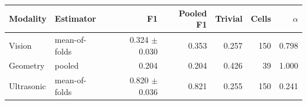 \begin{tabular}{@{}llrrrrr@{}}
\toprule
Modality & Estimator & F1 & Pooled F1 & Trivial & Cells & $\alpha$ \\
\midrule
Vision & mean-of-folds & 0.324 $\pm$ 0.030 & 0.353 & 0.257 & 150 & 0.798 \\
Geometry & pooled & 0.204 & 0.204 & 0.426 & 39 & 1.000 \\
Ultrasonic & mean-of-folds & 0.820 $\pm$ 0.036 & 0.821 & 0.255 & 150 & 0.241 \\
\bottomrule
\end{tabular}
